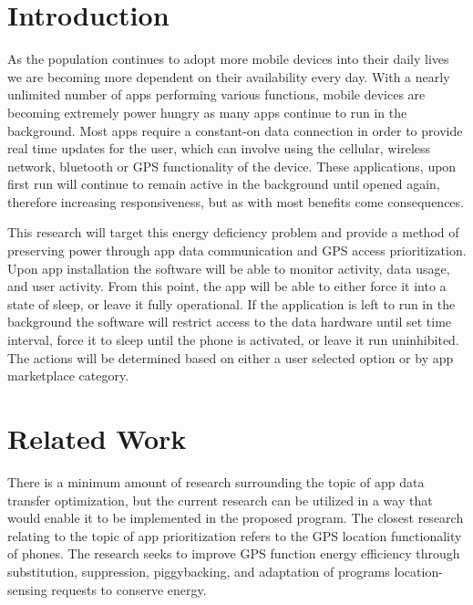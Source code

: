\documentclass[11pt]{article}
\begin{document}
\maketitle

\vspace*{-.4in}
\section{Introduction}
\label{sec:introduction}
\vspace*{-.1in}

As the population continues to adopt more mobile devices into their daily lives we are becoming more dependent on their availability every day. With a nearly unlimited number of apps performing various functions, mobile devices are becoming extremely power hungry as many apps continue to run in the background. Most apps require a constant-on data connection in order to provide real time updates for the user, which can involve using the cellular, wireless network, bluetooth or GPS functionality of the device. These applications, upon first run will continue to remain active in the background until opened again, therefore increasing responsiveness, but as with most benefits come consequences.

This research will target this energy deficiency problem and provide a method of preserving power through app data communication and GPS access prioritization. Upon app installation the software will be able to monitor activity, data usage, and user activity. From this point, the app will be able to either force it into a state of sleep, or leave it fully operational. If the application is left to run in the background the software will restrict access to the data hardware until set time interval, force it to sleep until the phone is activated, or leave it run uninhibited. The actions will be determined based on either a user selected option or by app marketplace category.



\vspace*{-.1in}
\section{Related Work}
\label{sec:relatedwork}
\vspace*{-.1in}

There is a minimum amount of research surrounding the topic of app data transfer optimization, but the current research can be utilized in a way that would enable it to be implemented in the proposed program. The closest research relating to the topic of app prioritization refers to the GPS location functionality of phones. The research seeks to improve GPS function energy efficiency through substitution, suppression, piggybacking, and adaptation of programs location-sensing requests to conserve energy. \cite{Zhuang:2010:IEE:1814433.1814464} 
\end{document}
